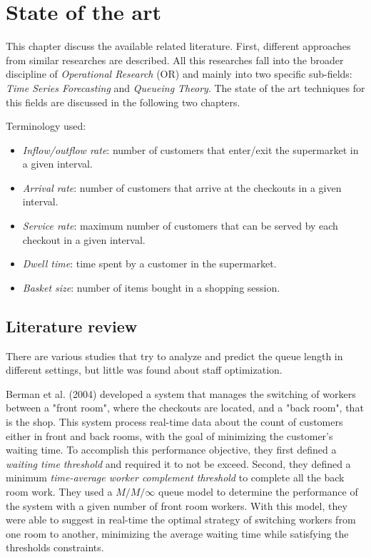 \chapter{State of the art}
\label{cha:state_of_art}

This chapter discuss the available related literature. First, different approaches from similar researches are described. All this researches fall into the broader discipline of \emph{Operational Research} (OR) and mainly into two specific sub-fields: \emph{Time Series Forecasting} and \emph{Queueing Theory}. The state of the art techniques for this fields are discussed in the following two chapters.

Terminology used:
\begin{itemize}
  \item \emph{Inflow/outflow rate}: number of customers that enter/exit the supermarket in a given interval.
  \item \emph{Arrival rate}: number of customers that arrive at the checkouts in a given interval.
  \item \emph{Service rate}: maximum number of customers that can be served by each checkout in a given interval.
  \item \emph{Dwell time}: time spent by a customer in the supermarket.
  \item \emph{Basket size}: number of items bought in a shopping session.
\end{itemize}


\section{Literature review}
\label{sec:literature_review}

There are various studies that try to analyze and predict the queue length in different settings, but little was found about staff optimization.

Berman et al. (2004) \cite{berman} developed a system that manages the switching of workers between a "front room", where the checkouts are located, and a "back room", that is the shop. This system process real-time data about the count of customers either in front and back rooms, with the goal of minimizing the customer's waiting time. To accomplish this performance objective, they first defined a \emph{waiting time threshold} and required it to not be exceed. Second, they defined a minimum \emph{time-average worker complement threshold} to complete all the back room work. They used a \( M/M/\infty \) queue model to determine the performance of the system with a given number of front room workers. With this model, they were able to suggest in real-time the optimal strategy of switching workers from one room to another, minimizing the average waiting time while satisfying the thresholds constraints.

